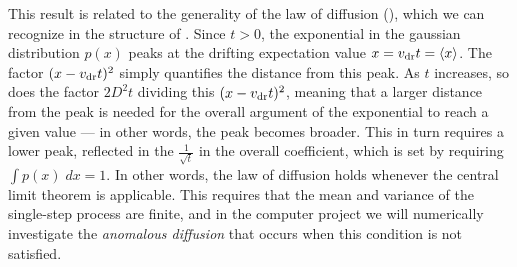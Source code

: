 This result is related to the generality of the law of diffusion (), which we can recognize in the structure of .
Since $t > 0$, the exponential in the gaussian distribution $p(x)$ peaks at the drifting expectation value $x = v_{\mathrm{dr}} t = \left\langle x \right\rangle$.
The factor $(x - v_{\mathrm{dr}} t)^2$ simply quantifies the distance from this peak.
As $t$ increases, so does the factor $2D^2 t$ dividing this $(x - v_{\mathrm{dr}} t)^2$, meaning that a larger distance from the peak is needed for the overall argument of the exponential to reach a given value --- in other words, the peak becomes broader.
This in turn requires a lower peak, reflected in the $\frac{1}{\sqrt{t}}$ in the overall coefficient, which is set by requiring $\int p(x) \; dx = 1$.
In other words, the law of diffusion holds whenever the central limit theorem is applicable.
This requires that the mean and variance of the single-step process are finite, and in the computer project we will numerically investigate the \textit{anomalous diffusion} that occurs when this condition is not satisfied.
